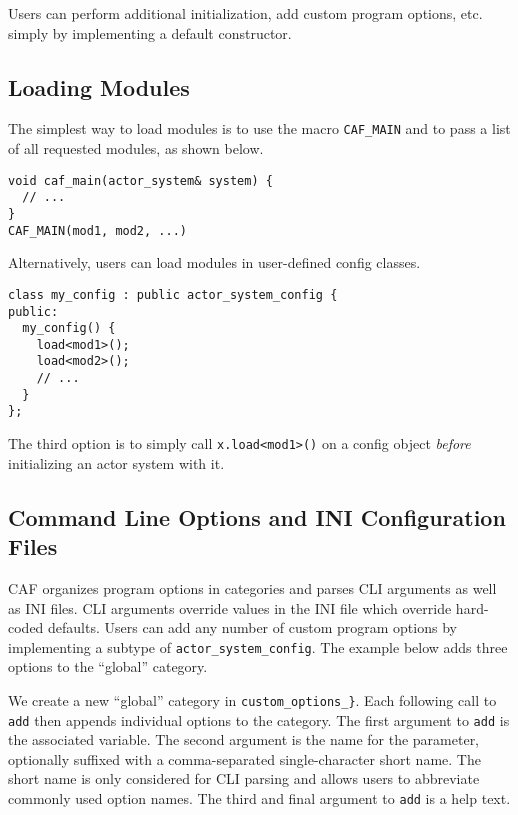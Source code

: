 Users can perform additional initialization, add custom program options, etc.
simply by implementing a default constructor.

\subsection{Loading Modules}
\label{system-config-module}

The simplest way to load modules is to use the macro \lstinline^CAF_MAIN^ and
to pass a list of all requested modules, as shown below.

\begin{lstlisting}
void caf_main(actor_system& system) {
  // ...
}
CAF_MAIN(mod1, mod2, ...)
\end{lstlisting}

Alternatively, users can load modules in user-defined config classes.

\begin{lstlisting}
class my_config : public actor_system_config {
public:
  my_config() {
    load<mod1>();
    load<mod2>();
    // ...
  }
};
\end{lstlisting}

The third option is to simply call \lstinline^x.load<mod1>()^ on a config
object \emph{before} initializing an actor system with it.

\subsection{Command Line Options and INI Configuration Files}
\label{system-config-options}

CAF organizes program options in categories and parses CLI arguments as well
as INI files. CLI arguments override values in the INI file which override
hard-coded defaults. Users can add any number of custom program options by
implementing a subtype of \lstinline^actor_system_config^. The example below
adds three options to the ``global'' category.


We create a new ``global'' category in  \lstinline^custom_options_}^. Each
following call to \lstinline^add^ then appends individual options to the
category. The first argument to \lstinline^add^ is the associated variable. The
second argument is the name for the parameter, optionally suffixed with a
comma-separated single-character short name. The short name is only considered
for CLI parsing and allows users to abbreviate commonly used option names. The
third and final argument to \lstinline^add^ is a help text.

